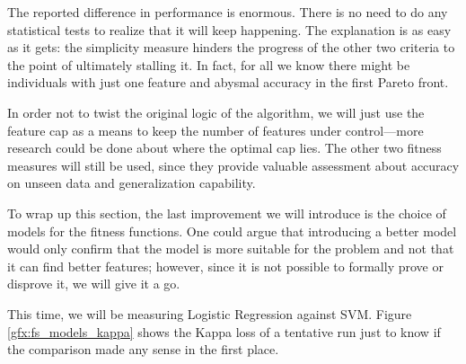 	The reported difference in performance is enormous. There is no need to do any statistical tests to realize that it will keep happening. The explanation is as easy as it gets: the simplicity measure hinders the progress of the other two criteria to the point of ultimately stalling it. In fact, for all we know there might be individuals with just one feature and abysmal accuracy in the first Pareto front.

	In order not to twist the original logic of the algorithm, we will just use the feature cap as a means to keep the number of features under control---more research could be done about where the optimal cap lies. The other two fitness measures will still be used, since they provide valuable assessment about accuracy on unseen data and generalization capability.

\newpage

	To wrap up this section, the last improvement we will introduce is the choice of models for the fitness functions. One could argue that introducing a better model would only confirm that the model is more suitable for the problem and not that it can find better features; however, since it is not possible to formally prove or disprove it, we will give it a go.

	This time, we will be measuring Logistic Regression against \ac{SVM}. Figure \ref{gfx:fs_models_kappa} shows the Kappa loss of a tentative run just to know if the comparison made any sense in the first place.

	\vspace{0.3cm}

